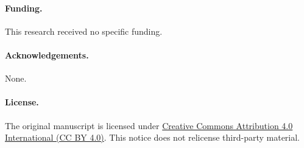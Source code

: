 \documentclass[11pt,a4paper]{article}
\numberwithin{equation}{section}
\theoremstyle{remark}
\begin{document}
\paragraph{Funding.} This research received no specific funding.
\paragraph{Acknowledgements.} None.
\paragraph{License.} The original manuscript is licensed under
\href{https://creativecommons.org/licenses/by/4.0/}{Creative Commons Attribution 4.0 International (CC BY 4.0)}.
This notice does not relicense third-party material.


\end{document}
